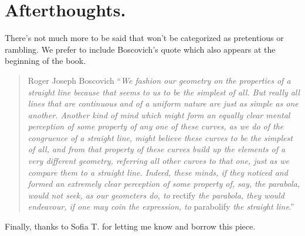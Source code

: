 \section{Afterthoughts.}

There's not much more to be said that won't be categorized as pretentious or rambling. We prefer to include Boscovich's quote which also appears at the beginning of the book.

\begin{quote}{Roger Joseph Boscovich}
	\enquote{\textit{We fashion our geometry on the properties of a straight line because that seems to us to be the simplest of all. But really all lines that are continuous and of a uniform nature are just as simple as one another. Another kind of mind which might form an equally clear mental perception of some property of any one of these curves, as we do of the congruence of a straight line, might believe these curves to be the simplest of all, and from that property of these curves build up the elements of a very different geometry, referring all other curves to that one, just as we compare them to a straight line. Indeed, these minds, if they noticed and formed an extremely clear perception of some property of, say, the parabola, would not seek, as our geometers do, to} rectify \textit{the parabola, they would endeavour, if one may coin the expression, to} parabolify \textit{the straight line}.}
\end{quote}

Finally, thanks to Sofia T. for letting me know and borrow this piece.
